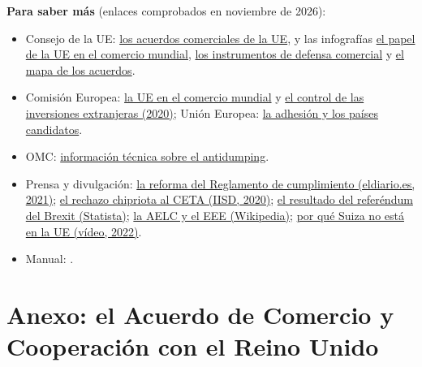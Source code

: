 \documentclass[11pt]{article}
\begin{document}
\begin{anotaciones}
\textbf{Para saber más} (enlaces comprobados en noviembre de 2026):
\begin{itemize}
\item Consejo de la UE: \href{https://www.consilium.europa.eu/es/policies/trade-policy/trade-agreements/}{los acuerdos comerciales de la UE}, y las infografías \href{https://www.consilium.europa.eu/es/infographics/the-eu-s-role-in-global-trade/}{el papel de la UE en el comercio mundial}, \href{https://www.consilium.europa.eu/es/infographics/trade-defence-instruments/}{los instrumentos de defensa comercial} y \href{https://www.consilium.europa.eu/en/infographics/eu-trade-map/}{el mapa de los acuerdos}.
\item Comisión Europea: \href{https://ec.europa.eu/trade/policy/eu-position-in-world-trade/}{la UE en el comercio mundial} y \href{https://ec.europa.eu/commission/presscorner/detail/es/ip_20_1867}{el control de las inversiones extranjeras (2020)}; Unión Europea: \href{https://european-union.europa.eu/principles-countries-history/joining-eu_es}{la adhesión y los países candidatos}.
\item OMC: \href{https://www.wto.org/spanish/tratop_s/adp_s/adp_info_s.htm}{información técnica sobre el antidumping}.
\item Prensa y divulgación: \href{https://www.eldiario.es/politica/eurocamara-aprueba-mayores-poderes-ue-controversias-comerciales_1_6944760.html}{la reforma del Reglamento de cumplimiento (eldiario.es, 2021)}; \href{https://www.iisd.org/itn/en/2020/10/05/ceta-faces-hurdle-after-cypriot-parliament-fails-to-ratify-the-agreement/}{el rechazo chipriota al CETA (IISD, 2020)}; \href{https://www.statista.com/chart/5100/uk-chooses-brexit/}{el resultado del referéndum del Brexit (Statista)}; \href{https://en.wikipedia.org/wiki/European_Free_Trade_Association}{la AELC y el EEE (Wikipedia)}; \href{https://www.youtube.com/watch?v=bVDjaTO_y9Y}{por qué Suiza no está en la UE (vídeo, 2022)}.
\item Manual: \textcite[cap.~6]{Camarero2019Economia}.
\end{itemize}
\end{anotaciones}

\section{Anexo: el Acuerdo de Comercio\cortetitulo{} y Cooperación con el Reino Unido}\label{anexo:reino-unido}
\end{document}
